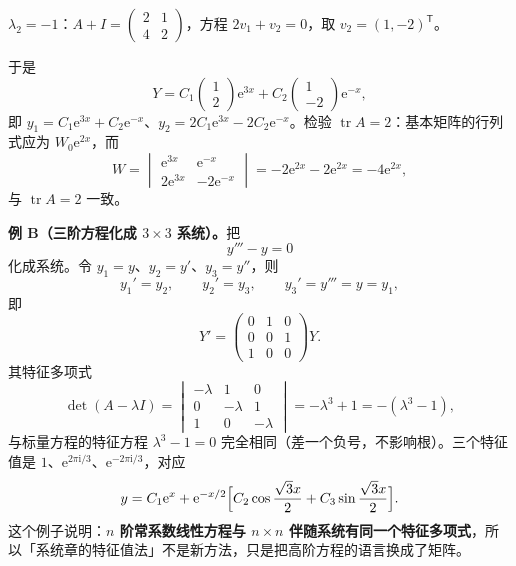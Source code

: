 \documentclass[11pt]{ctexart}
\let\orighdr\hdr
\renewcommand{\hdr}[2]{\needspace{6\baselineskip}\orighdr{#1}{#2}}
\newcommand{\tr}{\operatorname{tr}}
\newcommand{\ii}{\mathrm{i}}
\newcommand{\ee}{\mathrm{e}}
\begin{document}
$\lambda_2=-1$：$A+I=\begin{pmatrix}2&1\\4&2\end{pmatrix}$，方程 $2v_1+v_2=0$，取 $v_2=(1,-2)^{\mathsf T}$。

于是
\[
Y=C_1\begin{pmatrix}1\\2\end{pmatrix}\ee^{3x}+C_2\begin{pmatrix}1\\-2\end{pmatrix}\ee^{-x},
\]
即 $y_1=C_1\ee^{3x}+C_2\ee^{-x}$、$y_2=2C_1\ee^{3x}-2C_2\ee^{-x}$。检验 $\tr A=2$：基本矩阵的行列式应为 $W_0\ee^{2x}$，而
\[
W=\begin{vmatrix}\ee^{3x}&\ee^{-x}\\2\ee^{3x}&-2\ee^{-x}\end{vmatrix}
=-2\ee^{2x}-2\ee^{2x}=-4\ee^{2x},
\]
与 $\tr A=2$ 一致。

\textbf{例 B（三阶方程化成 $3\times3$ 系统）。}把
\[
y'''-y=0
\]
化成系统。令 $y_1=y$、$y_2=y'$、$y_3=y''$，则
\[
y_1'=y_2,\qquad y_2'=y_3,\qquad y_3'=y'''=y=y_1,
\]
即
\[
Y'=\begin{pmatrix}0&1&0\\0&0&1\\1&0&0\end{pmatrix}Y .
\]
其特征多项式
\[
\det(A-\lambda I)=\begin{vmatrix}-\lambda&1&0\\0&-\lambda&1\\1&0&-\lambda\end{vmatrix}
=-\lambda^3+1=-(\lambda^3-1),
\]
与标量方程的特征方程 $\lambda^3-1=0$ 完全相同（差一个负号，不影响根）。三个特征值是 $1$、$\ee^{2\pi\ii/3}$、$\ee^{-2\pi\ii/3}$，对应
\[
y=C_1\ee^x+\ee^{-x/2}\Bigl[C_2\cos\frac{\sqrt3x}{2}+C_3\sin\frac{\sqrt3x}{2}\Bigr].
\]
这个例子说明：\textbf{$n$ 阶常系数线性方程与 $n\times n$ 伴随系统有同一个特征多项式}，所以「系统章的特征值法」不是新方法，只是把高阶方程的语言换成了矩阵。


\end{document}

